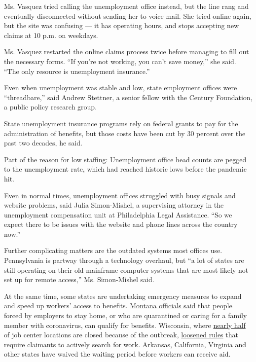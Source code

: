 Ms. Vasquez tried calling the unemployment office instead, but the line
rang and eventually disconnected without sending her to voice mail. She
tried online again, but the site was confusing --- it has operating
hours, and stops accepting new claims at 10 p.m. on weekdays.

Ms. Vasquez restarted the online claims process twice before managing to
fill out the necessary forms. ``If you're not working, you can't save
money,'' she said. ``The only resource is unemployment insurance.''

Even when unemployment was stable and low, state employment offices were
``threadbare,'' said Andrew Stettner, a senior fellow with the Century
Foundation, a public policy research group.

State unemployment insurance programs rely on federal grants to pay for
the administration of benefits, but those costs have been cut by 30
percent over the past two decades, he said.

Part of the reason for low staffing: Unemployment office head counts are
pegged to the unemployment rate, which had reached historic lows before
the pandemic hit.

Even in normal times, unemployment offices struggled with busy signals
and website problems, said Julia Simon-Mishel, a supervising attorney in
the unemployment compensation unit at Philadelphia Legal Assistance.
``So we expect there to be issues with the website and phone lines
across the country now.''

Further complicating matters are the outdated systems most offices use.
Pennsylvania is partway through a technology overhaul, but ``a lot of
states are still operating on their old mainframe computer systems that
are most likely not set up for remote access,'' Ms. Simon-Mishel said.

At the same time, some states are undertaking emergency measures to
expand and speed up workers' access to benefits.
\href{http://governor.mt.gov/pressroom/governor-bullock-announces-emergency-rules-to-streamline-unemployment-benefits-for-workers-impacted-by-covid-19}{Montana
officials said} that people forced by employers to stay home, or who are
quarantined or caring for a family member with coronavirus, can qualify
for benefits. Wisconsin, where
\href{https://dwd.wisconsin.gov/covid19/public/det.htm}{nearly half} of
job center locations are closed because of the outbreak,
\href{https://dwd.wisconsin.gov/news/2020/200317-emergency-order.htmhttps://content.govdelivery.com/accounts/WIGOV/bulletins/281f868}{loosened
rules} that require claimants to actively search for work. Arkansas,
California, Virginia and other states have waived the waiting period
before workers can receive aid.

